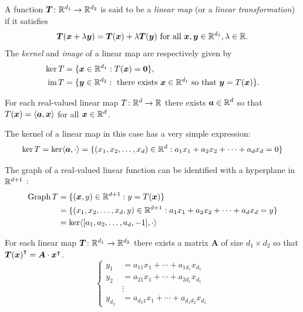 \begin{definition}\label{def:linearMap}
A function $\boldsymbol{T} \colon \mathbb{R}^{d_1} \to \mathbb{R}^{d_2}$ is said to be a \emph{linear map} (or a \emph{linear transformation}) if it satisfies 
\begin{equation*}
\boldsymbol{T}(\boldsymbol{x}+\lambda\boldsymbol{y}) = \boldsymbol{T}(\boldsymbol{x}) + \lambda \boldsymbol{T}(\boldsymbol{y}) \text{ for all }\boldsymbol{x}, \boldsymbol{y} \in \mathbb{R}^{d_1}, \lambda \in \mathbb{R}.
\end{equation*}  
The \emph{kernel} and \emph{image} of a linear map are respectively given by
\begin{align*}
\ker T & = \{ \boldsymbol{x} \in \mathbb{R}^{d_1} : T(\boldsymbol{x}) = \boldsymbol{0} \}, \\
\operatorname{im} T &= \{ \boldsymbol{y} \in \mathbb{R}^{d_2} : \text{ there exists }\boldsymbol{x} \in \mathbb{R}^{d_1} \text{ so that }\boldsymbol{y} = T(\boldsymbol{x}) \}.
\end{align*}
\end{definition}

\begin{remark}
For each real-valued linear map $T \colon \mathbb{R}^d \to \mathbb{R}$ there exists $\boldsymbol{a} \in \mathbb{R}^d$ so that $T(\boldsymbol{x}) = \langle \boldsymbol{a} , \boldsymbol{x} \rangle$ for all $\boldsymbol{x} \in \mathbb{R}^d$.

The kernel of a linear map in this case has a very simple expression:
\begin{equation*}
\ker T = \ker \langle \boldsymbol{a}, \cdot \rangle = \{ (x_1, x_2, \dotsc, x_d) \in \mathbb{R}^d : a_1 x_1 + a_2 x_2 + \dotsb + a_d x_d = 0 \}
\end{equation*}

The graph of a real-valued linear function can be identified with a hyperplane in $\mathbb{R}^{d+1}$ :
\begin{align*}
\operatorname{Graph} T &= \{ (\boldsymbol{x},y) \in \mathbb{R}^{d+1} : y = T(\boldsymbol{x}) \} \\
&= \{ (x_1, x_2, \dotsc, x_d, y) \in \mathbb{R}^{d+1} : a_1x_1 + a_2 x_2 + \dotsb + a_dx_d = y \} \\
& = \ker \langle [a_1, a_2, \dotsc, a_d, -1], \cdot \rangle
\end{align*}
\end{remark}

\begin{remark}
For each linear map $\boldsymbol{T} \colon \mathbb{R}^{d_1} \to \mathbb{R}^{d_2}$ there exists a matrix $\boldsymbol{A}$ of size $d_1 \times d_2$ so that ${\boldsymbol{T}(\boldsymbol{x})}^\intercal = \boldsymbol{A} \cdot {\boldsymbol{x}}^\intercal$.
\begin{equation*}
\begin{cases} 
y_1 &= a_{11} x_1 + \dotsb + a_{1d_1} x_{d_1} \\ 
y_2 &= a_{21} x_1 + \dotsb + a_{2d_1} x_{d_1} \\
    &\vdots \\
y_{d_2} &= a_{d_2 1} x_1 + \dotsb + a_{d_1 d_2} x_{d_1}
\end{cases}
\end{equation*}
\end{remark}

